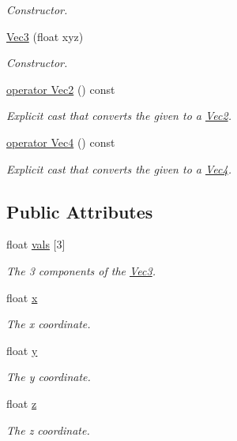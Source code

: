 \begin{DoxyCompactItemize}
\begin{DoxyCompactList}\small\item\em Constructor. \end{DoxyCompactList}\item 
\hyperlink{structgfxmath_1_1_vec3_aa9067613452e593627e33477cd4b63a3}{Vec3} (float xyz)
\begin{DoxyCompactList}\small\item\em Constructor. \end{DoxyCompactList}\item 
\hyperlink{structgfxmath_1_1_vec3_a75e16fdee00a8ad1c6bb3e8d129bf9a5}{operator Vec2} () const 
\begin{DoxyCompactList}\small\item\em Explicit cast that converts the given to a \hyperlink{structgfxmath_1_1_vec2}{Vec2}. \end{DoxyCompactList}\item 
\hyperlink{structgfxmath_1_1_vec3_a63202163a9e528a6bd3a432b3b4ca686}{operator Vec4} () const 
\begin{DoxyCompactList}\small\item\em Explicit cast that converts the given to a \hyperlink{structgfxmath_1_1_vec4}{Vec4}. \end{DoxyCompactList}\end{DoxyCompactItemize}
\subsection*{Public Attributes}
\begin{DoxyCompactItemize}
\item 
float \hyperlink{structgfxmath_1_1_vec3_a9ce2feb7167c9fd1d521838da1daa7f9}{vals} \mbox{[}3\mbox{]}
\begin{DoxyCompactList}\small\item\em The 3 components of the \hyperlink{structgfxmath_1_1_vec3}{Vec3}. \end{DoxyCompactList}\item 
float \hyperlink{structgfxmath_1_1_vec3_adb7cecf3b6d25eecf3924583f41d8c3a}{x}
\begin{DoxyCompactList}\small\item\em The x coordinate. \end{DoxyCompactList}\item 
float \hyperlink{structgfxmath_1_1_vec3_a398bee406395fdc1ad381f5b70d7fd99}{y}
\begin{DoxyCompactList}\small\item\em The y coordinate. \end{DoxyCompactList}\item 
float \hyperlink{structgfxmath_1_1_vec3_a93c1920712889d4f10520c7dc76a79c7}{z}
\begin{DoxyCompactList}\small\item\em The z coordinate. \end{DoxyCompactList}\end{DoxyCompactItemize}
